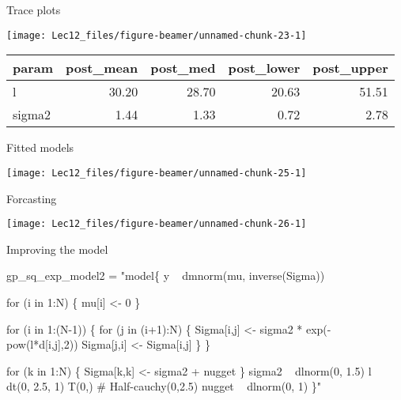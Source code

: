 \documentclass[11pt,ignorenonframetext,]{beamer}
\newenvironment{Shaded}{}{}
\newcommand{\NormalTok}[1]{#1}
\newcommand{\StringTok}[1]{\textcolor[rgb]{0.25,0.44,0.63}{#1}}
\let\oldShaded\Shaded
\let\endoldShaded\endShaded
\renewenvironment{Shaded}{\footnotesize\begin{spacing}{0.9}\oldShaded}{\endoldShaded\end{spacing}}
\begin{document}
\begin{frame}{Trace plots}
\protect\hypertarget{trace-plots}{}

\begin{center}\texttt{[image: Lec12\_files/figure-beamer/unnamed-chunk-23-1]} \end{center}

\footnotesize

\begin{longtable}[]{@{}lrrrr@{}}
\toprule
param & post\_mean & post\_med & post\_lower &
post\_upper\tabularnewline
\midrule
\endhead
l & 30.20 & 28.70 & 20.63 & 51.51\tabularnewline
sigma2 & 1.44 & 1.33 & 0.72 & 2.78\tabularnewline
\bottomrule
\end{longtable}

\end{frame}

\begin{frame}{Fitted models}
\protect\hypertarget{fitted-models}{}

\begin{center}\texttt{[image: Lec12\_files/figure-beamer/unnamed-chunk-25-1]} \end{center}

\end{frame}

\begin{frame}{Forcasting}
\protect\hypertarget{forcasting}{}

\begin{center}\texttt{[image: Lec12\_files/figure-beamer/unnamed-chunk-26-1]} \end{center}

\end{frame}

\begin{frame}[fragile]{Improving the model}
\protect\hypertarget{improving-the-model}{}

\begin{Shaded}
\begin{Highlighting}[]
\NormalTok{gp_sq_exp_model2 =}\StringTok{ "model\{}
\StringTok{  y ~ dmnorm(mu, inverse(Sigma))}

\StringTok{  for (i in 1:N) \{}
\StringTok{    mu[i] <- 0}
\StringTok{  \}}

\StringTok{  for (i in 1:(N-1)) \{}
\StringTok{    for (j in (i+1):N) \{}
\StringTok{      Sigma[i,j] <- sigma2 * exp(- pow(l*d[i,j],2))}
\StringTok{      Sigma[j,i] <- Sigma[i,j]}
\StringTok{    \}}
\StringTok{  \}}

\StringTok{  for (k in 1:N) \{}
\StringTok{    Sigma[k,k] <- sigma2 + nugget}
\StringTok{  \}}
\StringTok{  }
\StringTok{  sigma2   ~ dlnorm(0, 1.5)}
\StringTok{  l        ~ dt(0, 2.5, 1) T(0,) # Half-cauchy(0,2.5)}
\StringTok{  }
\StringTok{  nugget ~ dlnorm(0, 1)}
\StringTok{\}"}
\end{Highlighting}
\end{Shaded}

\end{frame}
\end{document}
